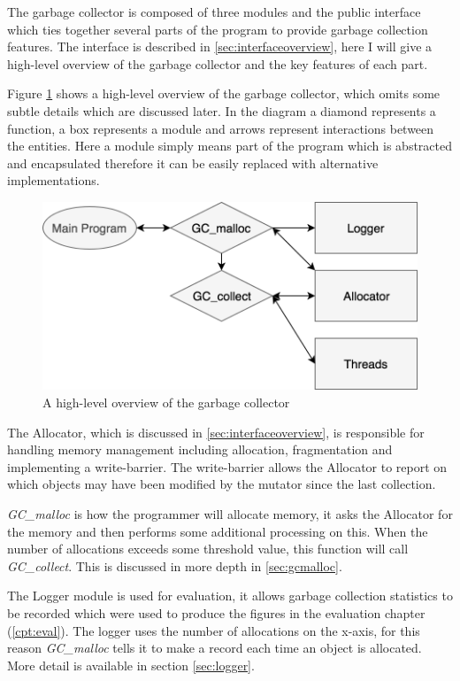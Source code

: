 \documentclass[../diss.tex]{subfiles}
\begin{document}
The garbage collector is composed of three modules and the public interface which ties together several parts of the program to provide garbage collection features. The interface is described in \cref{sec:interfaceoverview}, here I will give a high-level overview of the garbage collector and the key features of each part.

Figure \ref{fig:overview} shows a high-level overview of the garbage collector, which omits some subtle details which are discussed later. In the diagram a diamond represents a function, a box represents a module and arrows represent interactions between the entities. Here a module simply means part of the program which is abstracted and encapsulated therefore it can be easily replaced with alternative implementations.

\begin{figure}
    \centering
    \includegraphics[max width=0.8\linewidth]{figs/overview.png}
    \caption{A high-level overview of the garbage collector}
    \label{fig:overview}
\end{figure}

The Allocator, which is discussed in \cref{sec:interfaceoverview}, is responsible for handling memory management including allocation, fragmentation and implementing a write-barrier. The write-barrier allows the Allocator to report on which objects may have been modified by the mutator since the last collection.

\emph{GC\_malloc} is how the programmer will allocate memory, it asks the Allocator for the memory and then performs some additional processing on this. When the number of allocations exceeds some threshold value, this function will call \emph{GC\_collect}. This is discussed in more depth in \cref{sec:gcmalloc}.

The Logger module is used for evaluation, it allows garbage collection statistics to be recorded which were used to produce the figures in the evaluation chapter (\cref{cpt:eval}). The logger uses the number of allocations on the x-axis, for this reason \emph{GC\_malloc} tells it to make a record each time an object is allocated. More detail is available in section \cref{sec:logger}.
\end{document}
